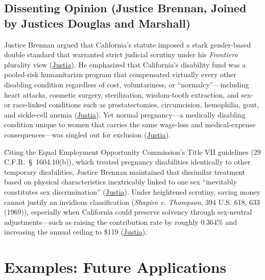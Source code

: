 \documentclass[12pt]{article}
\begin{document}
\subsection{Dissenting Opinion (Justice Brennan, Joined by Justices Douglas and Marshall)}

Justice Brennan argued that California's statute imposed a stark gender-based double standard that warranted strict judicial scrutiny under his \textit{Frontiero} plurality view (\href{https://supreme.justia.com/cases/federal/us/417/484/}{Justia}). He emphasized that California's disability fund was a pooled-risk humanitarian program that compensated virtually every other disabling condition regardless of cost, voluntariness, or ``normalcy''---including heart attacks, cosmetic surgery, sterilization, wisdom-tooth extraction, and sex- or race-linked conditions such as prostatectomies, circumcision, hemophilia, gout, and sickle-cell anemia (\href{https://supreme.justia.com/cases/federal/us/417/484/}{Justia}). Yet normal pregnancy---a medically disabling condition unique to women that carries the same wage-loss and medical-expense consequences---was singled out for exclusion (\href{https://supreme.justia.com/cases/federal/us/417/484/}{Justia}).

Citing the Equal Employment Opportunity Commission's Title VII guidelines (29 C.F.R.\ \S~1604.10(b)), which treated pregnancy disabilities identically to other temporary disabilities, Justice Brennan maintained that dissimilar treatment based on physical characteristics inextricably linked to one sex ``inevitably constitutes sex discrimination'' (\href{https://supreme.justia.com/cases/federal/us/417/484/}{Justia}). Under heightened scrutiny, saving money cannot justify an invidious classification (\textit{Shapiro v. Thompson}, 394 U.S. 618, 633 (1969)), especially when California could preserve solvency through sex-neutral adjustments---such as raising the contribution rate by roughly 0.364\% and increasing the annual ceiling to \$119 (\href{https://supreme.justia.com/cases/federal/us/417/484/}{Justia}).

\section{Examples: Future Applications}
\end{document}
